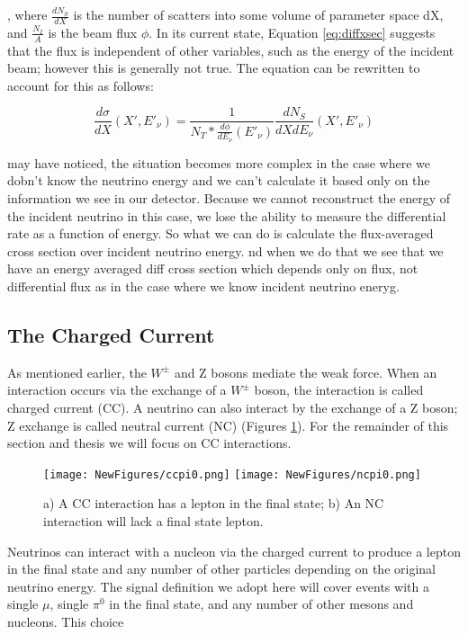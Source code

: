 \documentclass[12pt]{article}
\begin{document}
, where $\frac{dN_S}{dX}$ is the number of scatters into some volume of parameter space dX, and $\frac{N_I}{A}$ is the beam flux $\phi$. In its current state, Equation \ref{eq:diffxsec} suggests that the flux is independent of other variables, such as the energy of the incident beam; however this is generally not true. The equation can be rewritten to account for this as follows:

\begin{equation}
\frac{d\sigma}{dX}(X',E'_\nu) = \frac{1}{N_T*\frac{d\phi}{dE_\nu}(E'_\nu)}\frac{dN_S}{dXdE_\nu}(X',E'_\nu)
\label{eq:diffxsec_edep}
\end{equation}

may have noticed, the situation becomes more complex in the case where we dobn’t know the neutrino energy and we can’t calculate it based only on the information we see in our detector.  Because we cannot reconstruct the energy of the incident neutrino in this case, we lose the ability to measure the differential rate as a function of energy.  So what we can do is calculate the flux-averaged cross section over incident neutrino energy.  nd when we do that we see that we have an energy averaged diff cross section which depends only on flux, not differential flux as in the case where we know incident neutrino eneryg. 


\subsection{The Charged Current}
As mentioned earlier, the $W^\pm$ and Z bosons mediate the weak force. When an interaction occurs via the exchange of a $W^\pm$ boson, the interaction is called charged current (CC).  A neutrino can also interact by the exchange of a Z boson; Z exchange is called neutral current (NC) (Figures \ref{fig:CCNC}). For the remainder of this section and thesis we will focus on CC interactions. 


\begin{figure}[H]
\centering
\texttt{[image: NewFigures/ccpi0.png]}
\hspace{3 mm}
\texttt{[image: NewFigures/ncpi0.png]}
\caption{a) A CC interaction has a lepton in the final state; b) An NC interaction will lack a final state lepton.} 
\label{fig:CCNC}
\end{figure}

Neutrinos can interact with a nucleon via the charged current to produce a lepton in the final state and any number of other particles depending on the original neutrino energy. The signal definition we adopt here will cover events with a single $\mu$, single $\pi^0$ in the final state, and any number of other mesons and nucleons. This choice
\end{document}
